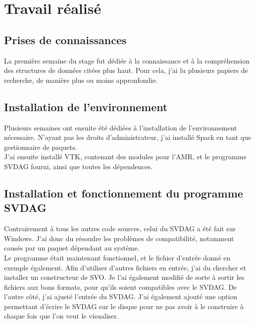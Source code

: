 \documentclass[12pt,a4paper,twoside]{article}
\begin{document}
    \begin{figure}[H]
    \end{figure}

    \begin{figure}[H]
    \end{figure}

    \section{Travail réalisé}

    \subsection{Prises de connaissances}

    La première semaine du stage fut dédiée à la connaissance et à la compréhension des structures de données citées plus haut.
    Pour cela, j'ai lu plusieurs papiers de recherche, de manière plus ou moins appronfondie.

    \subsection{Installation de l'environnement}

    Plusieurs semaines ont ensuite été dédiées à l'installation de l'environnement nécessaire.
    N'ayant pas les droits d'administrateur, j'ai installé Spack en tant que gestionnaire de paquets.\\
    J'ai ensuite installé VTK, contenant des modules pour l'AMR, et le programme SVDAG fourni, ainsi que toutes les dépendences.

    \subsection{Installation et fonctionnement du programme SVDAG}

    Contrairement à tous les autres code sources, celui du SVDAG a été fait sur Windows. J'ai donc du résoudre les problèmes
    de compatibilité, notamment causés par un paquet dépendant au système. \\
    Le programme était maintenant fonctionnel, et le fichier d'entrée donné en exemple également.
    Afin d'utiliser d'autres fichiers en entrée, j'ai du chercher et installer un constructeur de SVO. Je l'ai également
    modifié de sorte à sortir les fichiers aux bons formats, pour qu'ils soient compatibles avec le SVDAG.
    De l'autre côté, j'ai ajusté l'entrée du SVDAG. J'ai également ajouté une option permettant d'écrire le SVDAG sur
    le disque pour ne pas avoir à le construire à chaque fois que l'on veut le visualiser.
\end{document}
